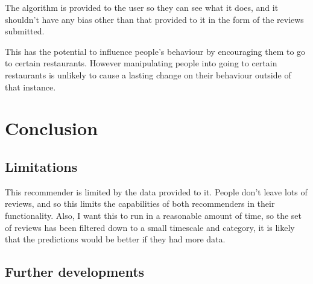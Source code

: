 \documentclass[conference]{IEEEtran}
\begin{document}
The algorithm is provided to the user so they can see what it does, and it shouldn't have any bias other than that provided to it in the form of the reviews submitted.

This has the potential to influence people's behaviour by encouraging them to go to certain restaurants. However manipulating people into going to certain restaurants is unlikely to cause a lasting change on their behaviour outside of that instance.



\section{Conclusion}

\subsection{Limitations}

This recommender is limited by the data provided to it. People don't leave lots of reviews, and so this limits the capabilities of both recommenders in their functionality. Also, I want this to run in a reasonable amount of time, so the set of reviews has been filtered down to a small timescale and category, it is likely that the predictions would be better if they had more data.

\subsection{Further developments}




\end{document}
